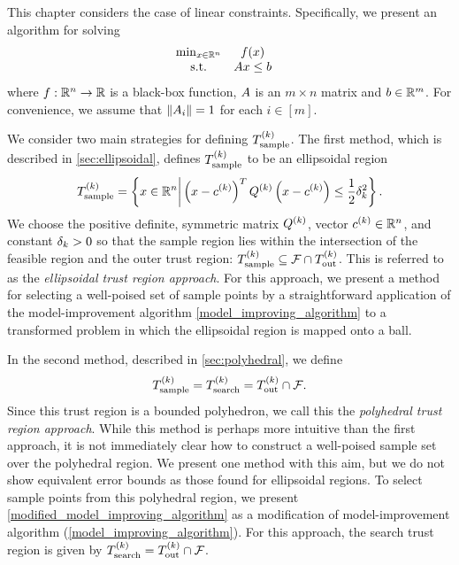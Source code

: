 This chapter considers the case of linear constraints.
Specifically, we present an algorithm for solving
\begin{align}
\label{eq:DFO-linear}
\begin{array}{ccl} \min_{x \in \mathbb R^n} & f(x) \\
\textrm{s.t.} & {A} x \le {b} & 
\end{array}
\end{align}
where $f:\mathbb R^n\rightarrow\mathbb R$ is a black-box function, 
${A}$ is an $m \times n$ matrix and ${b} \in \mathbb R^m$.
For convenience, we assume that $\left\|{A}_i\right\| = 1$ for each $i \in [m]$.

We consider two main strategies for defining ${T_{\text{sample}}^{(k)}}$.
The first method,  which is described in \cref{sec:ellipsoidal},  
defines ${T_{\text{sample}}^{(k)}}$ to be an ellipsoidal region
\begin{align}
\label{define_the_sample_region}
{T_{\text{sample}}^{(k)}} = \left\{x \in \mathbb R^n \bigg | \left(x - c^{(k)}\right)^T {Q^{(k)}} \left(x - c^{(k)}\right) \le \frac 1 2 \delta_k^2 \right\}.
\end{align}
We choose the positive definite, symmetric matrix ${Q^{(k)}}$, vector $c^{(k)} \in \mathbb R^n$, and constant $\delta_k > 0$ so that
the sample region lies within the intersection of the feasible region and the outer trust region:
${T_{\text{sample}}^{(k)}} \subseteq {\mathcal F} \cap {T_{\text{out}}^{(k)}}$.
This is referred to as the {\em ellipsoidal trust region approach}.
For this approach, we present a method for selecting a well-poised set of sample points by a straightforward application 
of the model-improvement algorithm \cref{model_improving_algorithm} to a transformed problem in which 
the ellipsoidal region is mapped onto a ball.




In the second method,  described in \cref{sec:polyhedral}, we define 
\begin{align*}
{T_{\text{sample}}^{(k)}} = {T_{\text{search}}^{(k)}} = {T_{\text{out}}^{(k)}} \cap {\mathcal F}.
\end{align*}
Since this trust region is a bounded polyhedron,  we call this the {\em polyhedral trust region approach}.
While this method is perhaps more intuitive than the first approach,
it is not immediately clear how to construct a well-poised sample set over the polyhedral region.
We present one method with this aim, but we do not show equivalent error bounds as those found for ellipsoidal regions.
To select sample points from this polyhedral region, 
we present \cref{modified_model_improving_algorithm} as a modification of model-improvement algorithm (\cref{model_improving_algorithm}).
For this approach, the search trust region is given by ${T_{\text{search}}^{(k)}} = {T_{\text{out}}^{(k)}} \cap {\mathcal F}$.

